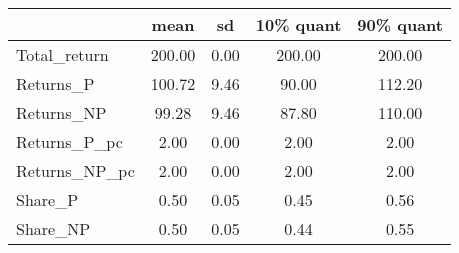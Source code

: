 \begin{tabular}{lcccc}
\toprule
{} &    mean &    sd &  10\% quant &  90\% quant \\
\midrule
Total\_return  &  200.00 &  0.00 &     200.00 &     200.00 \\
Returns\_P     &  100.72 &  9.46 &      90.00 &     112.20 \\
Returns\_NP    &   99.28 &  9.46 &      87.80 &     110.00 \\
Returns\_P\_pc  &    2.00 &  0.00 &       2.00 &       2.00 \\
Returns\_NP\_pc &    2.00 &  0.00 &       2.00 &       2.00 \\
Share\_P       &    0.50 &  0.05 &       0.45 &       0.56 \\
Share\_NP      &    0.50 &  0.05 &       0.44 &       0.55 \\
\bottomrule
\end{tabular}
